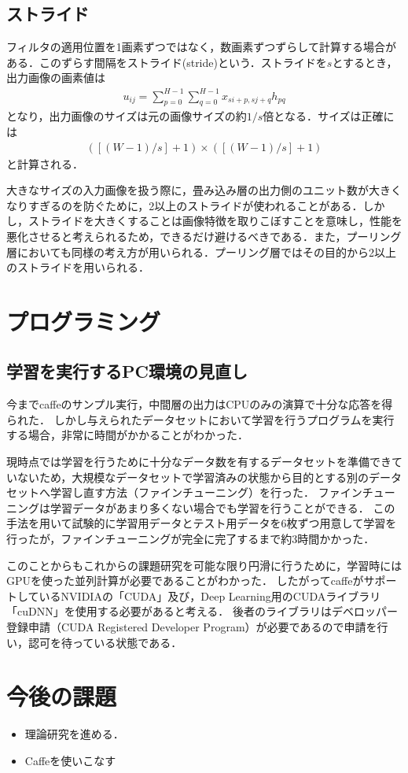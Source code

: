 \documentclass[a4paper,10pt]{jsarticle}
\begin{document}
\subsection{ストライド}
フィルタの適用位置を1画素ずつではなく，数画素ずつずらして計算する場合がある．このずらす間隔をストライド(stride)という．ストライドを$s$とするとき，出力画像の画素値は
\begin{eqnarray}
 u_{ij} = \sum^{H-1}_{p=0}\sum^{H-1}_{q=0} x_{si+p,sj+q}h_{pq}
\end{eqnarray}
となり，出力画像のサイズは元の画像サイズの約$1/s$倍となる．サイズは正確には
\begin{eqnarray}
 \left(\left[\left(W-1\right)/s\right]+1\right)\times \left(\left[\left(W-1\right)/s\right]+1\right)
\end{eqnarray}
と計算される．

大きなサイズの入力画像を扱う際に，畳み込み層の出力側のユニット数が大きくなりすぎるのを防ぐために，2以上のストライドが使われることがある．しかし，ストライドを大きくすることは画像特徴を取りこぼすことを意味し，性能を悪化させると考えられるため，できるだけ避けるべきである．また，プーリング層においても同様の考え方が用いられる．プーリング層ではその目的から2以上のストライドを用いられる．
\section{プログラミング}
\subsection{学習を実行するPC環境の見直し}
今までcaffeのサンプル実行，中間層の出力はCPUのみの演算で十分な応答を得られた．
しかし与えられたデータセットにおいて学習を行うプログラムを実行する場合，非常に時間がかかることがわかった．

現時点では学習を行うために十分なデータ数を有するデータセットを準備できていないため，大規模なデータセットで学習済みの状態から目的とする別のデータセットへ学習し直す方法（ファインチューニング）を行った．
ファインチューニングは学習データがあまり多くない場合でも学習を行うことができる．
この手法を用いて試験的に学習用データとテスト用データを6枚ずつ用意して学習を行ったが，ファインチューニングが完全に完了するまで約3時間かかった．

このことからもこれからの課題研究を可能な限り円滑に行うために，学習時にはGPUを使った並列計算が必要であることがわかった．
したがってcaffeがサポートしているNVIDIAの「CUDA」及び，Deep Learning用のCUDAライブラリ「cuDNN」を使用する必要があると考える．
後者のライブラリはデベロッパー登録申請（CUDA Registered Developer Program）が必要であるので申請を行い，認可を待っている状態である．

\section{今後の課題}
\begin{itemize}
 \item 理論研究を進める．
 \item Caffeを使いこなす
\end{itemize}
\end{document}
